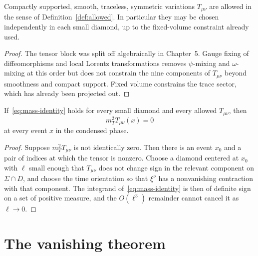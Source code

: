 \begin{lemma}
  \label{lem:arbitrary}
  Compactly supported, smooth, traceless, symmetric variations
  \(T_{\mu\nu}\) are allowed in the sense of
  Definition~\ref{def:allowed}. In particular they may be chosen
  independently in each small diamond, up to the fixed-volume
  constraint already used.
\end{lemma}

\begin{proof}
  The tensor block was split off algebraically in Chapter~5. Gauge
  fixing of diffeomorphisms and local Lorentz transformations
  removes \(\psi\)-mixing and \(\omega\)-mixing at this order but
  does not constrain the nine components of \(T_{\mu\nu}\) beyond
  smoothness and compact support. Fixed volume constrains the
  trace sector, which has already been projected out.
\end{proof}

\begin{lemma}
  \label{lem:point}
  If~\eqref{eq:mass-identity} holds for every small diamond and
  every allowed \(T_{\mu\nu}\), then
  \begin{equation}
    \label{eq:point}
    m_T^2 T_{\mu\nu}(x)=0
  \end{equation}
  at every event \(x\) in the condensed phase.
\end{lemma}

\begin{proof}
  Suppose \(m_T^2 T_{\mu\nu}\) is not identically zero. Then there
  is an event \(x_0\) and a pair of indices at which the tensor
  is nonzero. Choose a diamond centered at \(x_0\) with \(\ell\)
  small enough that \(T_{\mu\nu}\) does not change sign in the
  relevant component on \(\Sigma\cap D\), and choose the time
  orientation so that \(\xi^\nu\) has a nonvanishing contraction
  with that component. The integrand of~\eqref{eq:mass-identity} is
  then of definite sign on a set of positive measure, and the
  \(O(\ell^3)\) remainder cannot cancel it as \(\ell\to 0\).
\end{proof}

\section{The vanishing theorem}
\label{sec:ch7-theorem}

